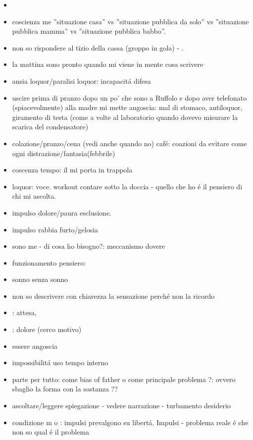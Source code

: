 \begin{itemize}
\item {}
\item coscienza me ''situazione casa'' vs ''situazione pubblica da solo'' vs ''situazione pubblica mamma'' vs ''situazione pubblica babbo''.
\item non so rispondere al tizio della cassa (groppo in gola) - .
\item la mattina sono pronto quando mi viene in mente cosa scrivere
\item ansia loquor/paralisi loquor: incapacit\'a difesa
\item uscire prima di pranzo dopo un po' che sono a Ruffolo e dopo aver telefonato (spiacevolmente) alla madre mi mette angoscia: mal di stomaco, antiloquor, giramento di testa (come a volte al laboratorio quando dovevo misurare la scarica del condensatore)
\item colazione/pranzo/cena (vedi anche quando no) caf\'e: coazioni da evitare come ogni distrazione/fantasia(febbrile)
\item coscenza tempo: il  mi porta in trappola
\item loquor: voce.
workout contare sotto la doccia - quello che ho \'e il pensiero di chi mi ascolta.
\item impulso dolore/paura esclusione.
\item impulso rabbia furto/gelosia
\item sono me - di cosa ho bisogno?: meccanismo dovere
\item funzionamento pensiero: 
\item sonno senza sonno
\item non so descrivere con chiarezza la sensazione perch\'e non la ricordo
\item {}: attesa, 
\item {}: dolore (cerco motivo)
\item essere angoscia
\item impossibilit\'a uso tempo interno
\item parte per tutto:  come bias of father o come principale problema ?: ovvero sbaglio la forma con la sostanza ??
\item ascoltare/leggere spiegazione - vedere narrazione - turbamento desiderio
\item condizione m o : impulsi prevalgono su libert\'a.
Impulsi -  problema reale \'e che non so qual \'e il problema
\end{itemize}

